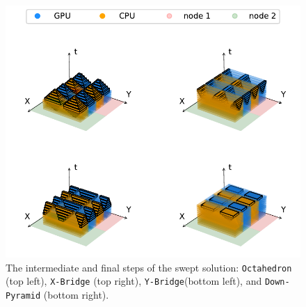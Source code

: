 \documentclass[mca,article,submit,moreauthors,pdftex]{Definitions/mdpi}
\def\Down{\texttt{Down-Pyramid}}
\def\Oct{\texttt{Octahedron}}
\def\Xb{\texttt{X-Bridge}}
\def\Yb{\texttt{Y-Bridge}}
\begin{document}
\begin{figure}[htbp]
    \widefigure
    \includegraphics{figs/SubsPlot2.pdf}
    \caption{The intermediate and final steps of the swept solution: \Oct{} (top left), \Xb{} (top right), \Yb (bottom left), and \Down{} (bottom right).}
    \label{fig:MainTwo}
\end{figure}
\end{document}
